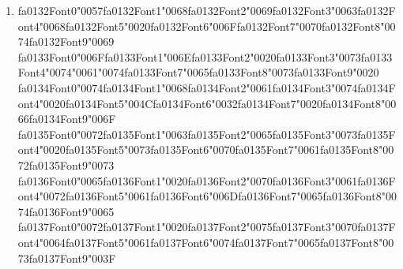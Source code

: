 \documentclass[12pt]{article}
\begin{document}
\begin{enumerate}[label=Q\arabic*.]
 \begin{enumerate}[label=(\Alph*)]
     \item The RNN uses different weights at each step
     \item The RNN ignores its previous hidden state
     \item The RNN does not produce outputs at intermediate steps
     \item The loss depends on the hidden state from time $t-1$ and the same weight matrices are reused across all time steps
 \end{enumerate}
 
 \item {\csname fa0132Font0\endcsname\char"0057}{\csname fa0132Font1\endcsname\char"0068}{\csname fa0132Font2\endcsname\char"0069}{\csname fa0132Font3\endcsname\char"0063}{\csname fa0132Font4\endcsname\char"0068}{\csname fa0132Font5\endcsname\char"0020}{\csname fa0132Font6\endcsname\char"006F}{\csname fa0132Font7\endcsname\char"0070}{\csname fa0132Font8\endcsname\char"0074}{\csname fa0132Font9\endcsname\char"0069} {\csname fa0133Font0\endcsname\char"006F}{\csname fa0133Font1\endcsname\char"006E}{\csname fa0133Font2\endcsname\char"0020}{\csname fa0133Font3\endcsname\char"0073}{\csname fa0133Font4\endcsname\char"0074}{\char"0061}{\char"0074}{\csname fa0133Font7\endcsname\char"0065}{\csname fa0133Font8\endcsname\char"0073}{\csname fa0133Font9\endcsname\char"0020} {\csname fa0134Font0\endcsname\char"0074}{\csname fa0134Font1\endcsname\char"0068}{\csname fa0134Font2\endcsname\char"0061}{\csname fa0134Font3\endcsname\char"0074}{\csname fa0134Font4\endcsname\char"0020}{\csname fa0134Font5\endcsname\char"004C}{\csname fa0134Font6\endcsname\char"0032}{\csname fa0134Font7\endcsname\char"0020}{\csname fa0134Font8\endcsname\char"0066}{\csname fa0134Font9\endcsname\char"006F} {\csname fa0135Font0\endcsname\char"0072}{\csname fa0135Font1\endcsname\char"0063}{\csname fa0135Font2\endcsname\char"0065}{\csname fa0135Font3\endcsname\char"0073}{\csname fa0135Font4\endcsname\char"0020}{\csname fa0135Font5\endcsname\char"0073}{\csname fa0135Font6\endcsname\char"0070}{\csname fa0135Font7\endcsname\char"0061}{\csname fa0135Font8\endcsname\char"0072}{\csname fa0135Font9\endcsname\char"0073} {\csname fa0136Font0\endcsname\char"0065}{\csname fa0136Font1\endcsname\char"0020}{\csname fa0136Font2\endcsname\char"0070}{\csname fa0136Font3\endcsname\char"0061}{\csname fa0136Font4\endcsname\char"0072}{\csname fa0136Font5\endcsname\char"0061}{\csname fa0136Font6\endcsname\char"006D}{\csname fa0136Font7\endcsname\char"0065}{\csname fa0136Font8\endcsname\char"0074}{\csname fa0136Font9\endcsname\char"0065} {\csname fa0137Font0\endcsname\char"0072}{\csname fa0137Font1\endcsname\char"0020}{\csname fa0137Font2\endcsname\char"0075}{\csname fa0137Font3\endcsname\char"0070}{\csname fa0137Font4\endcsname\char"0064}{\csname fa0137Font5\endcsname\char"0061}{\csname fa0137Font6\endcsname\char"0074}{\csname fa0137Font7\endcsname\char"0065}{\csname fa0137Font8\endcsname\char"0073}{\csname fa0137Font9\endcsname\char"003F}

\end{enumerate}
\end{document}
